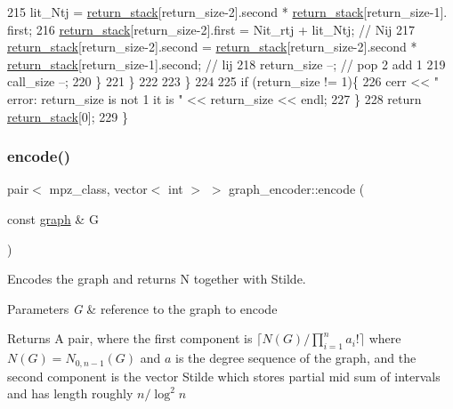\begin{DoxyCode}
215         lit\_Ntj = \hyperlink{namespacehelper__vars_a6d2100c373830cacd232319a9958652d}{return\_stack}[return\_size-2].second * \hyperlink{namespacehelper__vars_a6d2100c373830cacd232319a9958652d}{return\_stack}[return\_size-1].
      first;
216         \hyperlink{namespacehelper__vars_a6d2100c373830cacd232319a9958652d}{return\_stack}[return\_size-2].first = Nit\_rtj + lit\_Ntj; \textcolor{comment}{// Nij}
217         \hyperlink{namespacehelper__vars_a6d2100c373830cacd232319a9958652d}{return\_stack}[return\_size-2].second = \hyperlink{namespacehelper__vars_a6d2100c373830cacd232319a9958652d}{return\_stack}[return\_size-2].second * 
      \hyperlink{namespacehelper__vars_a6d2100c373830cacd232319a9958652d}{return\_stack}[return\_size-1].second; \textcolor{comment}{// lij}
218         return\_size --; \textcolor{comment}{// pop 2 add 1}
219         call\_size --;
220       \}
221     \}
222 
223   \}
224 
225   \textcolor{keywordflow}{if} (return\_size != 1)\{
226     cerr << \textcolor{stringliteral}{" error: return\_size is not 1 it is "} << return\_size << endl;
227   \}
228   \textcolor{keywordflow}{return} \hyperlink{namespacehelper__vars_a6d2100c373830cacd232319a9958652d}{return\_stack}[0];
229 \}
\end{DoxyCode}
\mbox{\label{classgraph__encoder_a23350e4c0986763b24d14c5ef1beb37e}} 
\subsubsection{\texorpdfstring{encode()}{encode()}}
{\footnotesize\ttfamily pair$<$ mpz\+\_\+class, vector$<$ int $>$ $>$ graph\+\_\+encoder\+::encode (\begin{DoxyParamCaption}\item[{const \hyperlink{classgraph}{graph} \&}]{G }\end{DoxyParamCaption})}



Encodes the graph and returns N together with Stilde. 


\begin{DoxyParams}{Parameters}
{\em G} & reference to the graph to encode \\
\hline
\end{DoxyParams}
\begin{DoxyReturn}{Returns}
A pair, where the first component is $\lceil N(G) / \prod_{i=1}^n a_i! \rceil$ where $N(G) = N_{0,n-1}(G)$ and $a$ is the degree sequence of the graph, and the second component is the vector Stilde which stores partial mid sum of intervals and has length roughly $n / \log^2 n$ 
\end{DoxyReturn}

